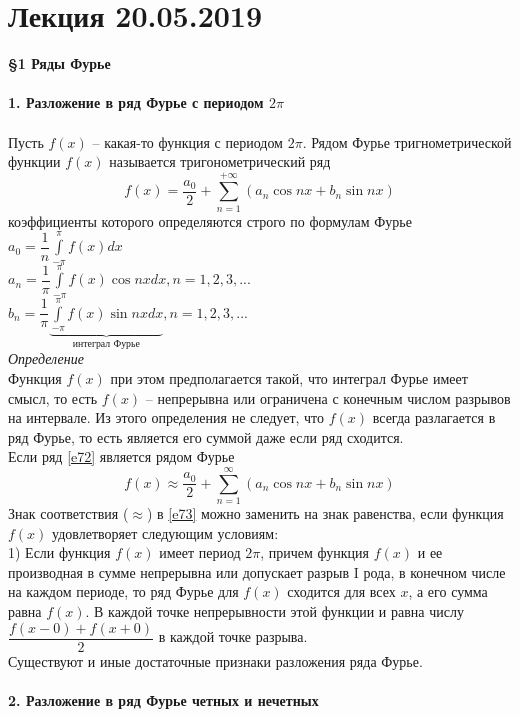\documentclass{article}
\numberwithin{equation}{section}
\begin{document}
\section{Лекция 20.05.2019}
\textbf{\large{\S1 Ряды Фурье}}
\\\\
\textbf{1. Разложение в ряд Фурье с периодом $2\pi$}
\\\\
Пусть $f(x)$ -- какая-то функция с периодом $2\pi$. Рядом Фурье тригнометрической функции $f(x)$ называется тригонометрический ряд
\begin{equation}\label{e72}
f(x)=\dfrac{a_0}{2}+\sum\limits_{n=1}^{+\infty}(a_n\cos nx+b_n\sin nx)
\end{equation}
коэффициенты которого определяются строго по формулам Фурье\\
$a_0=\dfrac{1}{n}\int\limits_{-\pi}^{\pi}f(x)dx$\\
$a_n=\dfrac{1}{\pi}\int\limits_{-\pi}^{\pi}f(x)\cos nxdx,n=1,2,3,...$\\
$b_n=\dfrac{1}{\pi}\underbrace{\int\limits_{-\pi}^{\pi}f(x)\sin nxdx}_{\mbox{интеграл Фурье}},n=1,2,3,...$\\
\textit{Определение}\\
Функция $f(x)$ при этом предполагается такой, что интеграл Фурье имеет смысл, то есть $f(x)$ -- непрерывна или ограничена с конечным числом разрывов на интервале. Из этого определения не следует, что $f(x)$ всегда разлагается в ряд Фурье, то есть является его суммой \colorbox{red!50}{даже если ряд сходится}.\\
Если ряд \eqref{e72} является рядом Фурье
\begin{equation}\label{e73}
f(x)\approx\dfrac{a_0}{2}+\sum\limits_{n=1}^\infty(a_n\cos nx+b_n\sin nx)
\end{equation}
Знак соответствия ($\approx$) в \eqref{e73} можно заменить на знак равенства, если функция $f(x)$ удовлетворяет следующим условиям:\\
1) Если функция $f(x)$  имеет период $2\pi$, причем функция $f(x)$ и ее производная в сумме непрерывна или допускает разрыв I рода, в конечном числе на каждом периоде, то ряд Фурье для $f(x)$ сходится для всех $x$, а его сумма равна $f(x)$. В каждой точке непрерывности этой функции и равна числу $\dfrac{f(x-0)+f(x+0)}{2}$ в каждой точке разрыва.\\
Существуют и иные достаточные признаки разложения ряда Фурье.
\\\\
\textbf{2. Разложение в ряд Фурье четных и нечетных}
\end{document}
